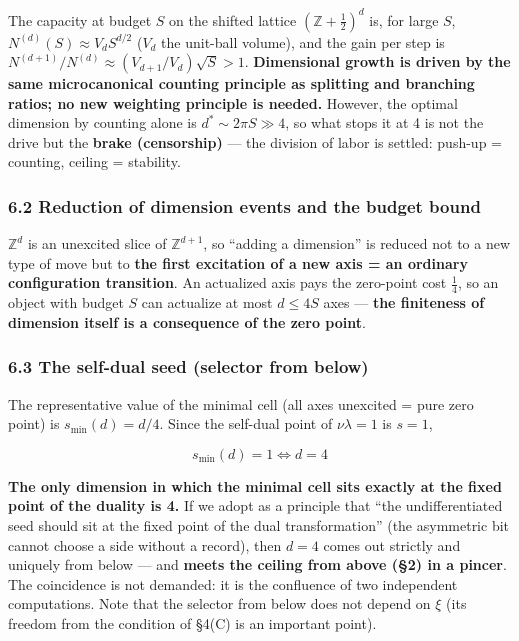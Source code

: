 \documentclass[
]{ltjsarticle}
\begin{document}
The capacity at budget \(S\) on the shifted lattice
\((\mathbb{Z}+\tfrac12)^d\) is, for large \(S\),
\(N^{(d)}(S)\approx V_d S^{d/2}\) (\(V_d\) the unit-ball volume), and
the gain per step is \(N^{(d+1)}/N^{(d)}\approx(V_{d+1}/V_d)\sqrt S>1\).
\textbf{Dimensional growth is driven by the same microcanonical counting
principle as splitting and branching ratios; no new weighting principle
is needed.} However, the optimal dimension by counting alone is
\(d^\ast\sim2\pi S\gg4\), so what stops it at 4 is not the drive but the
\textbf{brake (censorship)} --- the division of labor is settled:
push-up = counting, ceiling = stability.

\subsubsection{6.2 Reduction of dimension events and the budget
bound}\label{reduction-of-dimension-events-and-the-budget-bound}

\(\mathbb{Z}^d\) is an unexcited slice of \(\mathbb{Z}^{d+1}\), so
``adding a dimension'' is reduced not to a new type of move but to
\textbf{the first excitation of a new axis = an ordinary configuration
transition}. An actualized axis pays the zero-point cost \(\tfrac14\),
so an object with budget \(S\) can actualize at most \(d\le4S\) axes ---
\textbf{the finiteness of dimension itself is a consequence of the zero
point}.

\subsubsection{6.3 The self-dual seed (selector from
below)}\label{the-self-dual-seed-selector-from-below}

The representative value of the minimal cell (all axes unexcited = pure
zero point) is \(s_{\min}(d)=d/4\). Since the self-dual point of
\(\nu\lambda=1\) is \(s=1\),

\[
s_{\min}(d)=1\iff d=4
\]

\textbf{The only dimension in which the minimal cell sits exactly at the
fixed point of the duality is 4.} If we adopt as a principle that ``the
undifferentiated seed should sit at the fixed point of the dual
transformation'' (the asymmetric bit cannot choose a side without a
record), then \(d=4\) comes out strictly and uniquely from below --- and
\textbf{meets the ceiling from above (§2) in a pincer}. The coincidence
is not demanded: it is the confluence of two independent computations.
Note that the selector from below does not depend on \(\xi\) (its
freedom from the condition of §4(C) is an important point).
\end{document}

